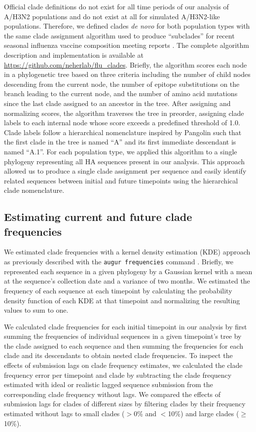 \documentclass[9pt,lineno]{elife}
\begin{document}
Official clade definitions do not exist for all time periods of our analysis of A/H3N2 populations and do not exist at all for simulated A/H3N2-like populations.
Therefore, we defined clades \emph{de novo} for both population types with the same clade assignment algorithm used to produce ``subclades'' for recent seasonal influenza vaccine composition meeting reports \citep{Huddleston2024}.
The complete algorithm description and implementation is available at \url{https://github.com/neherlab/flu_clades}.
Briefly, the algorithm scores each node in a phylogenetic tree based on three criteria including the number of child nodes descending from the current node, the number of epitope substitutions on the branch leading to the current node, and the number of amino acid mutations since the last clade assigned to an ancestor in the tree.
After assigning and normalizing scores, the algorithm traverses the tree in preorder, assigning clade labels to each internal node whose score exceeds a predefined threshold of 1.0.
Clade labels follow a hierarchical nomenclature inspired by Pangolin \citep{OToole2021} such that the first clade in the tree is named ``A'' and its first immediate descendant is named ``A.1''.
For each population type, we applied this algorithm to a single phylogeny representing all HA sequences present in our analysis.
This approach allowed us to produce a single clade assignment per sequence and easily identify related sequences between initial and future timepoints using the hierarchical clade nomenclature.

\subsection{Estimating current and future clade frequencies}

We estimated clade frequencies with a kernel density estimation (KDE) approach as previously described \citep{Huddleston2020} with the \texttt{augur frequencies} command \citep{Huddleston2021}.
Briefly, we represented each sequence in a given phylogeny by a Gaussian kernel with a mean at the sequence's collection date and a variance of two months.
We estimated the frequency of each sequence at each timepoint by calculating the probability density function of each KDE at that timepoint and normalizing the resulting values to sum to one.

We calculated clade frequencies for each initial timepoint in our analysis by first summing the frequencies of individual sequences in a given timepoint's tree by the clade assigned to each sequence and then summing the frequencies for each clade and its descendants to obtain nested clade frequencies.
To inspect the effects of submission lags on clade frequency estimates, we calculated the clade frequency error per timepoint and clade by subtracting the clade frequency estimated with ideal or realistic lagged sequence submission from the corresponding clade frequency without lags.
We compared the effects of submission lags for clades of different sizes by filtering clades by their frequency estimated without lags to small clades ($>$0\% and $<$10\%) and large clades ($\ge$10\%).
\end{document}
